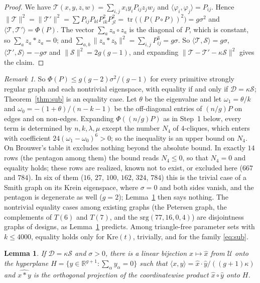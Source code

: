 \documentclass[11pt]{article}
\newtheorem{lemma}[theorem]{Lemma}
\theoremstyle{definition}
\theoremstyle{remark}
\newtheorem{remark}[theorem]{Remark}
\newcommand{\ip}[2]{\langle #1,#2\rangle}
\newcommand{\Kre}{\mathrm{Kre}}
\begin{document}
\begin{proof}
We have $\mathcal T(x,y,z,w)=\sum_{i,j}x_iy_iP_{ij}z_jw_j$ and
$\ip{\varphi_i}{\varphi_j}=P_{ij}$. Hence
$\|\mathcal T\|^2=\|\mathcal T'\|^2=\sum P_{ij}P_{kl}P_{ik}^2P_{jl}^2
=\operatorname{tr}\bigl((P(P\circ P))^2\bigr)=g\sigma^2$ and
$\ip{\mathcal T}{\mathcal T'}=\Phi(P)$. The vector $\sum_az_a\circ z_a$ is the
diagonal of $P$, which is constant, so $\sum_az_a*z_a=0$; and
$\sum_{a,b}\|z_a*z_b\|^2=\sum_{i,j}P_{ij}^3=g\sigma$. So
$\ip{\mathcal T}{\mathcal S}=g\sigma$, $\ip{\mathcal T'}{\mathcal S}=-g\sigma$
and $\|\mathcal S\|^2=2g(g-1)$, and expanding
$\|\mathcal T-\mathcal T'-\kappa\mathcal S\|^2$ gives the claim.
\end{proof}

\begin{remark}\label{rem:norton}
So $\Phi(P)\le g(g-2)\sigma^2/(g-1)$ for every primitive strongly regular
graph and each nontrivial eigenspace, with equality if and only if
$\mathcal D=\kappa\mathcal S$; Theorem~\ref{thm:sub} is an equality case.
Let $\theta$ be the eigenvalue and let $\omega_1=\theta/k$ and
$\omega_0=-(1+\theta)/(n-k-1)$ be the off-diagonal entries of $(n/g)P$ on
edges and on non-edges. Expanding $\Phi((n/g)P)$ as in Step~1 below, every
term is determined by $n,k,\lambda,\mu$ except the number $N_4$ of
$4$-cliques, which enters with coefficient $24(\omega_1-\omega_0)^6>0$; so the
inequality is an upper bound on $N_4$. On Brouwer's table it excludes nothing
beyond the absolute bound. In exactly $14$ rows (the pentagon among them) the
bound reads $N_4\le0$, so that $N_4=0$ and equality holds; these rows are
realized, known not to exist, or excluded here ($667$ and $784$). In six of
them ($16$, $27$, $100$, $162$, $324$, $784$) this is the trivial case of a
Smith graph on its Krein eigenspace, where $\sigma=0$ and both sides vanish,
and the pentagon is degenerate as well ($g=2$); Lemma~\ref{lem:simplex} then
says nothing. The nontrivial equality cases among
existing graphs (the Petersen graph, the complements of $T(6)$ and $T(7)$, and
the $\mathrm{srg}(77,16,0,4)$) are disjointness graphs of designs, as
Lemma~\ref{lem:simplex} predicts. Among triangle-free parameter sets with
$k\le4000$, equality holds only for $\Kre(t)$, trivially, and for the family
\eqref{eq:sub}.
\end{remark}

\begin{lemma}\label{lem:simplex}
If $\mathcal D=\kappa\mathcal S$ and $\sigma>0$, there is a linear bijection
$x\mapsto\hat x$ from $\mathcal U$ onto the hyperplane
$H=\{y\in\mathbb R^{g+1}:\sum_\alpha y_\alpha=0\}$ such that
$\ip xy=\hat x\cdot\hat y/((g+1)\kappa)$ and $\widehat{x*y}$ is the orthogonal
projection of the coordinatewise product $\hat x\circ\hat y$ onto $H$.
\end{lemma}
\end{document}
